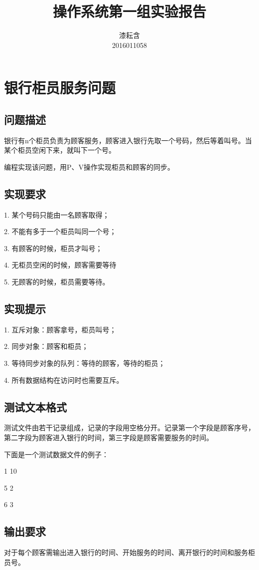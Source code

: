 \documentclass[UTF8]{ctexart}
\title{操作系统第一组实验报告}
\author{漆耘含\\2016011058}
\date{}
\begin{document}
\maketitle
\section{银行柜员服务问题}
\subsection{问题描述}
银行有n个柜员负责为顾客服务，顾客进入银行先取一个号码，然后等着叫号。当某个柜员空闲下来，就叫下一个号。\par
编程实现该问题，用P、V操作实现柜员和顾客的同步。\par

\subsection{实现要求}
1. 某个号码只能由一名顾客取得；\par
2. 不能有多于一个柜员叫同一个号；\par
3. 有顾客的时候，柜员才叫号；\par
4. 无柜员空闲的时候，顾客需要等待\par
5. 无顾客的时候，柜员需要等待。\par
\subsection{实现提示}
1. 互斥对象：顾客拿号，柜员叫号；\par
2. 同步对象：顾客和柜员；\par
3. 等待同步对象的队列：等待的顾客，等待的柜员；\par
4. 所有数据结构在访问时也需要互斥。\par
\subsection{测试文本格式}
测试文件由若干记录组成，记录的字段用空格分开。记录第一个字段是顾客序号，第二字段为顾客进入银行的时间，第三字段是顾客需要服务的时间。\par
下面是一个测试数据文件的例子：\par
{} 1 10\par
{} 5 2\par
{} 6 3\par
\subsection{输出要求}
对于每个顾客需输出进入银行的时间、开始服务的时间、离开银行的时间和服务柜员号。\par
\end{document}
